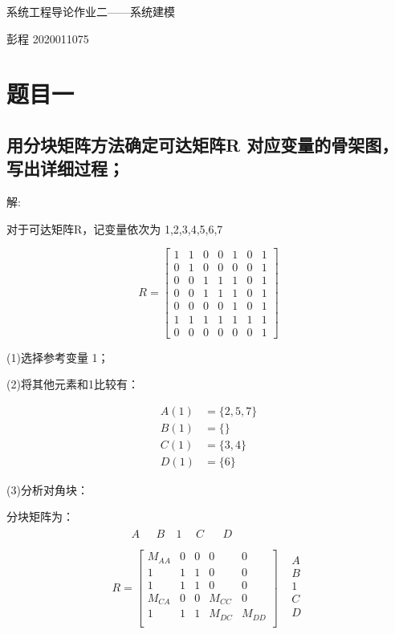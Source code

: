 \documentclass[UTF8]{ctexart}
\begin{document}
\begin{center}
  \Large{系统工程导论作业二——系统建模}\\
\end{center}
\begin{center}
  \large{彭程 2020011075}
\end{center}
\section{题目一}
\subsection{用分块矩阵方法确定可达矩阵R 对应变量的骨架图，写出详细过程；}

\noindent 解:

对于可达矩阵R，记变量依次为  1,2,3,4,5,6,7 

$$
R=\left[\begin{array}{lllllll}
1 & 1 & 0 & 0 & 1 & 0 & 1 \\
0 & 1 & 0 & 0 & 0 & 0 & 1 \\
0 & 0 & 1 & 1 & 1 & 0 & 1 \\
0 & 0 & 1 & 1 & 1 & 0 & 1 \\
0 & 0 & 0 & 0 & 1 & 0 & 1 \\
1 & 1 & 1 & 1 & 1 & 1 & 1 \\
0 & 0 & 0 & 0 & 0 & 0 & 1
\end{array}\right]
$$



\noindent (1)选择参考变量 1；

\noindent (2)将其他元素和1比较有：

\begin{align}
A(1)&=\{2,5,7\} \nonumber\\
B(1)&=\{\} \nonumber\\
C(1)&=\{3,4\} \nonumber\\
D(1)&=\{6\}\nonumber
\end{align}

\noindent (3)分析对角块：

分块矩阵为：
$$
\begin{matrix}
  \begin{matrix}~~~~~~A~&~~B&~1&~~C~&~~~D\\
\end{matrix}&\ \\
R=\left[
  \begin{matrix}
    M_{AA}&0&0&0&0\\
    1&1&1&0&0\\
    1&1&1&0&0\\
    M_{CA}&0&0&M_{CC}&0\\
    1&1&1&M_{DC}&M_{DD}\\
  \end{matrix}
  \right]
  &\begin{matrix}A\\B\\1\\C\\D\\\end{matrix}\\\end{matrix}
$$
\end{document}
